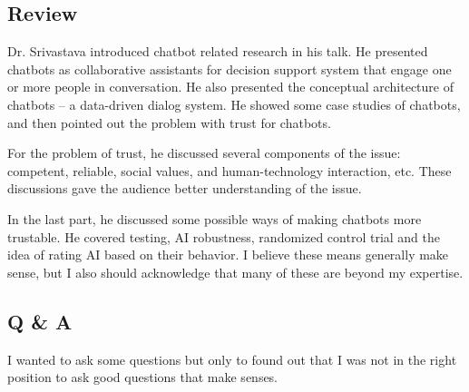 \documentclass[11pt, oneside]{article}   	%
\begin{document}
\subsection{Review}
Dr. Srivastava introduced chatbot related research in his talk. He presented chatbots as collaborative assistants for decision support system that engage one or more people in conversation. He also presented the conceptual architecture of chatbots -- a data-driven dialog system. He showed some case studies of chatbots, and then pointed out the problem with trust for chatbots.

For the problem of trust, he discussed several components of the issue: competent, reliable, social values, and human-technology interaction, etc. These discussions gave the audience better understanding of the issue.

In the last part, he discussed some possible ways of making chatbots more trustable. He covered testing, AI robustness, randomized control trial and the idea of rating AI based on their behavior. I believe these means generally make sense, but I also should acknowledge that many of these are beyond my expertise.

\subsection{Q \& A}
I wanted to ask some questions but only to found out that I was not in the right position to ask good questions that make senses. 

% 
% 
% 
% 
% 
% 
% 
% 
% 
% 
% 
% 
% 
% 
% 
% 
% 
% 
% 
% 




 
\end{document}
